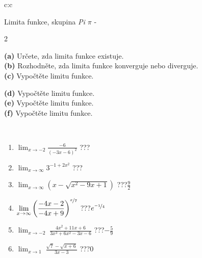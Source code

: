 \documentclass[10pt]{report}
\begin{document}
\begin{tabular}{c:c}
\begin{minipage}[c][104.5mm][t]{0.5\linewidth}
\begin{center}
\vspace{7mm}
{\huge Limita funkce, skupina \textit{Pi $\pi$} -}\\[5mm]
\begin{minipage}{0.95\linewidth}
\begin{center}
{\small \begin{multicols}{2} \raggedright
\textbf{(a)} Určete, zda limita funkce existuje. \\[1mm]
\textbf{(b)} Rozhodněte, zda limita funkce konverguje nebo diverguje. \\[1mm]
\textbf{(c)} Vypočtěte limitu funkce. \par \columnbreak
\textbf{(d)} Vypočtěte limitu funkce. \\[1mm]
\textbf{(e)} Vypočtěte limitu funkce. \\[1mm]
\textbf{(f)} Vypočtěte limitu funkce. \\[1mm]
\end{multicols}
}
\end{center}
\end{minipage}
\\[4mm]
\begin{minipage}{0.79\linewidth}
\begin{center}
\begin{varwidth}{\linewidth}
\begin{enumerate}
\normalsize
\item $\displaystyle\lim_{x\to-2}{\frac{-6}{(-3x-6)^{2}}}$\quad \dotfill\; ???\;\dotfill \quad {}
\item $\displaystyle\lim_{x\to\infty}{3^{-1+2x^2}}$\quad \dotfill\; ???\;\dotfill \quad {}
\item $\displaystyle\lim_{x\to\infty}{\left(x - \sqrt{x^2-9x+1}\right)}$\quad \dotfill\; ???\;\dotfill \quad $\frac{9}{2}$
\item $\displaystyle\lim_{x\to\infty}{\left( \frac{-4x-2}{-4x+9} \right)^{\nicefrac{x}{7}}}$\quad \dotfill\; ???\;\dotfill \quad $e^{\nicefrac{-1}{4}}$
\item $\displaystyle\lim_{x\to -2}{\;\frac{4x^2+11x+6}{3x^3+6x^2-3x-6}}$\quad \dotfill\; ???\;\dotfill \quad $-\frac{5}{9}$
\item $\displaystyle\lim_{x\to 1}{\;\frac{\sqrt{7}-\sqrt{x+6}}{3x-3}}$\quad \dotfill\; ???\;\dotfill \quad $0$
\end{enumerate}

\end{varwidth}
\end{center}
\end{minipage}
\end{center}
\end{minipage}
\end{tabular}
\end{document}
